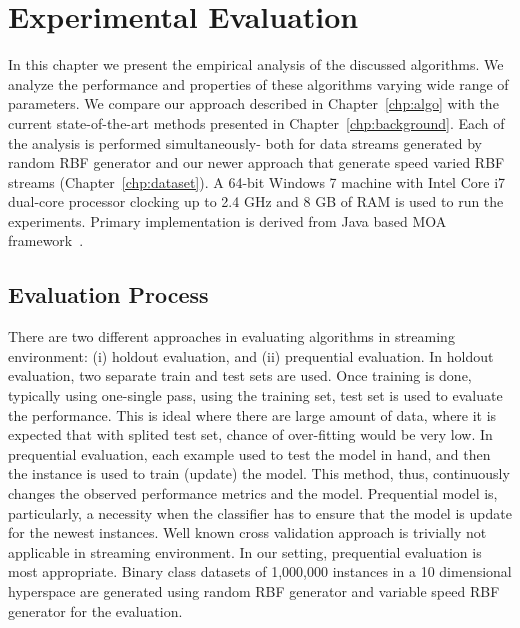 \chapter{Experimental Evaluation}
\label{chp:exp}
In this chapter we present the empirical analysis of the discussed algorithms. We analyze the performance and properties of these algorithms varying wide range of parameters. We compare our approach described in Chapter~\ref{chp:algo} with the current state-of-the-art methods presented in Chapter~\ref{chp:background}. Each of the analysis is performed simultaneously- both for data streams generated by random RBF generator and our newer approach that generate speed varied RBF streams (Chapter~\ref{chp:dataset}). A 64-bit Windows 7 machine with Intel Core i7 dual-core processor clocking up to 2.4 GHz and 8 GB of RAM is used to run the experiments. Primary implementation is derived from Java based MOA framework~\cite{bifet:moa10}. 


\section{Evaluation Process}
There are two different approaches in evaluating algorithms in streaming environment: (i) holdout evaluation, and (ii) prequential evaluation. In holdout evaluation, two separate train and test sets are used. Once training is done, typically using one-single pass, using the training set, test set is used to evaluate the performance. This is ideal where there are large amount of data, where it is expected that with splited test set, chance of over-fitting would be very low. In prequential evaluation, each example used to test the model in hand, and then the instance is used to train (update) the model. This method, thus, continuously changes the observed performance metrics and the model. Prequential model is, particularly, a necessity when the classifier has to ensure that the model is update for the newest instances. Well known cross validation approach is trivially not applicable in streaming environment. In our setting, prequential evaluation is most appropriate. Binary class datasets of 1,000,000 instances in a 10 dimensional hyperspace are generated using random RBF generator and variable speed RBF generator for the evaluation. 

